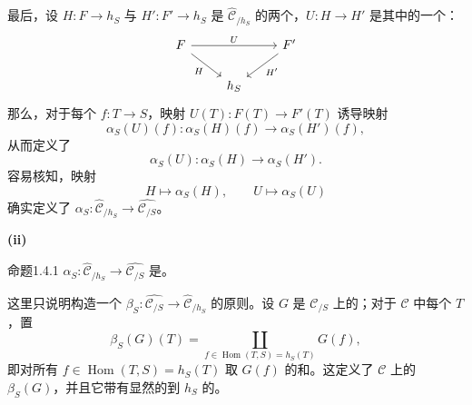 最后，设 $H:F\to h_S$ 与 $H':F'\to h_S$ 是 $\widehat{\mathcal C}_{/h_S}$ 的两个，$U:H\to H'$ 是其中的一个：
\[
\begin{tikzcd}
F\arrow[rr,"U"]\arrow[dr,"H"']&&F'\arrow[dl,"H'"]\\
&h_S&
\end{tikzcd}
\]
那么，对于每个 $f:T\to S$，映射 $U(T):F(T)\to F'(T)$ 诱导映射
\[
\alpha_S(U)(f):\alpha_S(H)(f)\longrightarrow\alpha_S(H')(f),
\]
从而定义了
\[
\alpha_S(U):\alpha_S(H)\longrightarrow\alpha_S(H').
\]
容易核知，映射
\[
H\longmapsto\alpha_S(H),\qquad U\longmapsto\alpha_S(U)
\]
确实定义了 $\alpha_S:\widehat{\mathcal C}_{/h_S}\to\widehat{\mathcal C_{/S}}$。

\textbf{(ii)}
\begin{SGAresult}{命题}{1.4.1}
 $\alpha_S:\widehat{\mathcal C}_{/h_S}\to\widehat{\mathcal C_{/S}}$ 是。
\end{SGAresult}
这里只说明构造一个 $\beta_S:\widehat{\mathcal C_{/S}}\to\widehat{\mathcal C}_{/h_S}$ 的原则。设 $G$ 是 $\mathcal C_{/S}$ 上的；对于 $\mathcal C$ 中每个 $T$，置
\[
\beta_S(G)(T)=\coprod_{f\in\operatorname{Hom}(T,S)=h_S(T)}G(f),
\]
即对所有 $f\in\operatorname{Hom}(T,S)=h_S(T)$ 取 $G(f)$ 的和。这定义了 $\mathcal C$ 上的 $\beta_S(G)$，并且它带有显然的到 $h_S$ 的。

